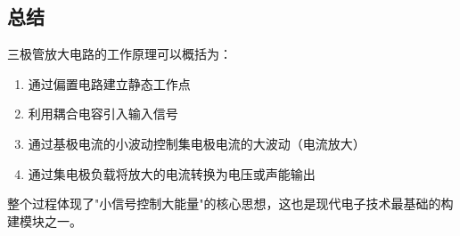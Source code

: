 \documentclass[12pt,UTF8]{ctexbook}
\begin{document}
\subsection{总结}

三极管放大电路的工作原理可以概括为：

\begin{enumerate}[leftmargin=2cm]
	\item 通过偏置电路建立静态工作点
	\item 利用耦合电容引入输入信号
	\item 通过基极电流的小波动控制集电极电流的大波动（电流放大）
	\item 通过集电极负载将放大的电流转换为电压或声能输出
\end{enumerate}

整个过程体现了"小信号控制大能量"的核心思想，这也是现代电子技术最基础的构建模块之一。


\backmatter
\end{document}
